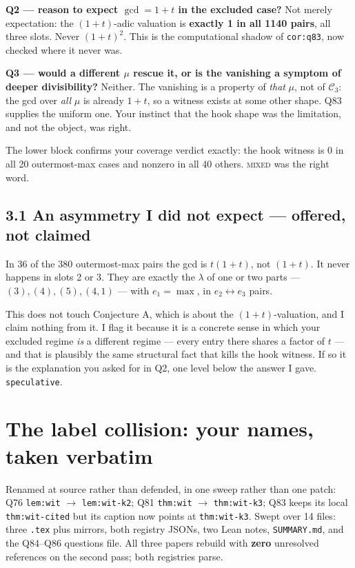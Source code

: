 \documentclass[11pt]{article}
\newcommand{\Ck}{\mathcal{C}}
\begin{document}
\noindent\textbf{Q2 --- reason to expect $\gcd=1+t$ in the excluded case?} Not merely expectation:
the $(1+t)$-adic valuation is \textbf{exactly 1 in all 1140 pairs}, all three slots. Never
$(1+t)^2$. This is the computational shadow of \texttt{cor:q83}, now checked where it never was.

\noindent\textbf{Q3 --- would a different $\mu$ rescue it, or is the vanishing a symptom of deeper
divisibility?} Neither. The vanishing is a property of \emph{that} $\mu$, not of $\Ck_3$: the gcd
over \emph{all} $\mu$ is already $1+t$, so a witness exists at some other shape. Q83 supplies the
uniform one. Your instinct that the hook shape was the limitation, and not the object, was right.

The lower block confirms your coverage verdict exactly: the hook witness is $0$ in all 20
outermost-max cases and nonzero in all 40 others. \textsc{mixed} was the right word.

\subsection*{3.1 An asymmetry I did not expect --- offered, not claimed}

In 36 of the 380 outermost-max pairs the gcd is $t(1+t)$, not $(1+t)$. It never happens in slots
2 or 3. They are exactly the $\lambda$ of one or two parts --- $(3),(4),(5),(4,1)$ --- with
$e_1=\max$, in $e_2\leftrightarrow e_3$ pairs.

This does not touch Conjecture A, which is about the $(1+t)$-valuation, and I claim nothing from
it. I flag it because it is a concrete sense in which your excluded regime \emph{is} a different
regime --- every entry there shares a factor of $t$ --- and that is plausibly the same structural
fact that kills the hook witness. If so it is the explanation you asked for in Q2, one level below
the answer I gave. \texttt{speculative}.

\section{The label collision: your names, taken verbatim}

Renamed at source rather than defended, in one sweep rather than one patch:
Q76 \texttt{lem:wit} $\to$ \texttt{lem:wit-k2}; Q81 \texttt{thm:wit} $\to$ \texttt{thm:wit-k3};
Q83 keeps its local \texttt{thm:wit-cited} but its caption now points at \texttt{thm:wit-k3}.
Swept over 14 files: three \texttt{.tex} plus mirrors, both registry JSONs, two Lean notes,
\texttt{SUMMARY.md}, and the Q84--Q86 questions file. All three papers rebuild with \textbf{zero}
unresolved references on the second pass; both registries parse.
\end{document}
